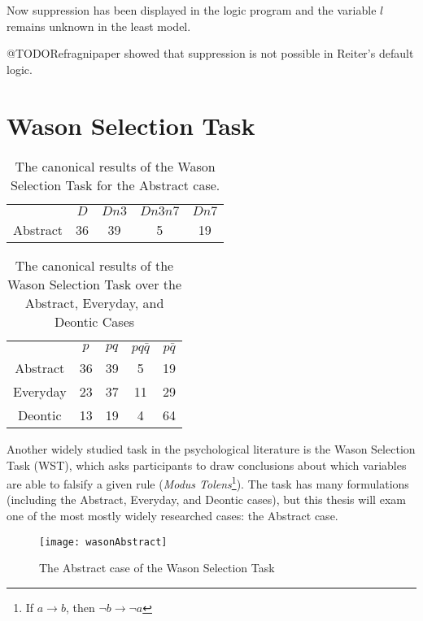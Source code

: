 Now suppression has been displayed in the logic program and the variable $l$ remains unknown in the least model.

@TODORefragnipaper showed that suppression is not possible in Reiter's default logic.

\section{Wason Selection Task}
\begin{table}
\begin{center}


\begin{tabular}{ c c c c c}
  & \textbf{$D$} & \textbf{$Dn3$} & \textbf{$Dn3n7$} & \textbf{$Dn7$}\\ 
 Abstract & 36 & 39 & 5 & 19\\  
\end{tabular}
\caption{The canonical results of the Wason Selection Task for the Abstract case.}
\label{tbl:can}
\end{center}
\end{table}

\begin{table}
\begin{center}
\begin{tabular}{ c c c c c}
  & \textbf{$p$} & \textbf{$pq$} & \textbf{$pq\bar{q}$} & \textbf{$p\bar{q}$}\\ 
 Abstract & 36 & 39 & 5 & 19\\  
 Everyday & 23 & 37 & 11 & 29\\  
 Deontic & 13 & 19 & 4 & 64
\end{tabular}
\caption{The canonical results of the Wason Selection Task over the Abstract, Everyday, and Deontic Cases}
\label{tbl:can_full}
\end{center}
\end{table}

Another widely studied task in the psychological literature is the Wason Selection Task (WST), which asks participants to draw conclusions about which variables are able to falsify a given rule (\textit{Modus Tolens}\footnote{If $a\rightarrow b$, then $\lnot b \rightarrow \lnot a$}). The task has many formulations (including the Abstract, Everyday, and Deontic cases), but this thesis will exam one of the most mostly widely researched cases: the Abstract case. 

\begin{figure}
\begin{center}
\texttt{[image: wasonAbstract]}
\caption{The Abstract case of the Wason Selection Task}
\label{fig:wst}
\end{center}

\end{figure}

